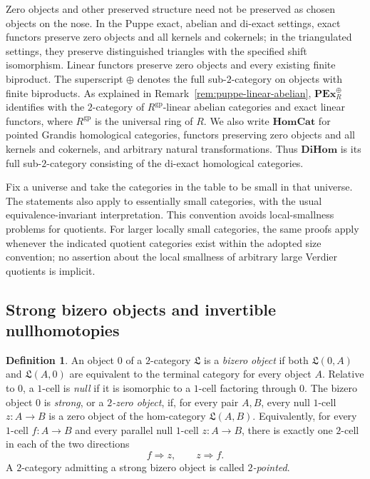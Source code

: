 \documentclass[11pt,reqno,a4paper]{amsart}
\theoremstyle{definition}
\newtheorem{definition}[theorem]{Definition}
\theoremstyle{remark}
\newcommand{\0}{\mathbf{0}}
\renewcommand{\1}{\mathbf{1}}
\newcommand{\HomCat}{\mathbf{HomCat}}
\newcommand{\DiHom}{\mathbf{DiHom}}
\newcommand{\Lcat}{\mathfrak L}
\begin{document}
Zero objects and other preserved structure need not be preserved as chosen
objects on the nose. In the Puppe exact, abelian and di-exact settings, exact functors preserve
zero objects and all kernels and cokernels; in the triangulated settings,
they preserve distinguished triangles with the specified shift isomorphism. Linear functors preserve zero
objects and every existing finite biproduct. The superscript $\oplus$
denotes the full sub-$2$-category on objects with finite biproducts.
As explained in Remark~\ref{rem:puppe-linear-abelian},
$\mathbf{PEx}_{R}^{\oplus}$ identifies with the $2$-category of
$R^{\mathrm{gp}}$-linear abelian categories and exact linear functors,
where $R^{\mathrm{gp}}$ is the universal ring of $R$. We also write $\HomCat$ for pointed Grandis
homological categories, functors preserving zero objects and all kernels
and cokernels, and arbitrary natural transformations. Thus $\DiHom$
is its full sub-$2$-category consisting of the di-exact homological categories.

Fix a universe and take the categories in the table to be small in that
universe. The statements also apply to essentially small categories, with
the usual equivalence-invariant interpretation. This convention avoids
local-smallness problems for quotients. For larger locally small categories,
the same proofs apply whenever the indicated quotient categories exist
within the adopted size convention; no assertion about the local smallness
of arbitrary large Verdier quotients is implicit.

\subsection{Strong bizero objects and invertible nullhomotopies}

\begin{definition}\label{def:2pointed}
An object $0$ of a $2$-category $\Lcat$ is a \emph{bizero object} if both
$\Lcat(0,A)$ and $\Lcat(A,0)$ are equivalent to the terminal category
for every object $A$. Relative to $0$, a $1$-cell is \emph{null} if it
is isomorphic to a $1$-cell factoring through $0$. The bizero object $0$ is \emph{strong}, or a \emph{$2$-zero object}, if,
for every pair $A,B$, every null $1$-cell $z:A\to B$ is a zero object
of the hom-category $\Lcat(A,B)$. Equivalently, for every $1$-cell
$f:A\to B$ and every parallel null $1$-cell $z:A\to B$, there is
exactly one $2$-cell in each of the two directions
\[
 f\Rightarrow z,
 \qquad z\Rightarrow f.
\]
A $2$-category admitting a strong bizero object is called
\emph{$2$-pointed}.
\end{definition}
\end{document}
